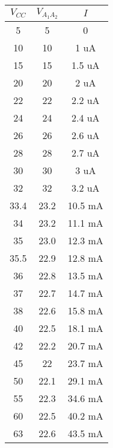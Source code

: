 \begin{minipage}[t]{0.5\linewidth}
  \begin{table}[H] %
    \begin{center}
      \begin{tabular}{c|c|c}
        $V_{CC}$ &$V_{A_1A_2}$ &$I$  \\
        \hline
        5     &5    &0     \\
        10    &10   &1    uA\\
        15    &15   &1.5  uA\\
        20    &20   &2    uA\\
        22    &22   &2.2  uA\\
        24    &24   &2.4  uA\\
        26    &26   &2.6  uA\\
        28    &28   &2.7  uA\\
        30    &30   &3    uA\\
        32    &32   &3.2  uA\\
        33.4  &23.2 &10.5 mA\\
        34    &23.2 &11.1 mA\\
        35    &23.0 &12.3 mA\\
        35.5  &22.9 &12.8 mA\\
        36    &22.8 &13.5 mA\\
        37    &22.7 &14.7 mA\\
        38    &22.6 &15.8 mA\\
        40    &22.5 &18.1 mA\\
        42    &22.2 &20.7 mA\\
        45    &22   &23.7 mA \\
        50    &22.1 &29.1 mA \\
        55    &22.3 &34.6 mA \\
        60    &22.5 &40.2 mA \\
        63    &22.6 &43.5 mA \\
      \end{tabular}
    \end{center} 
  \end{table}
\end{minipage}
